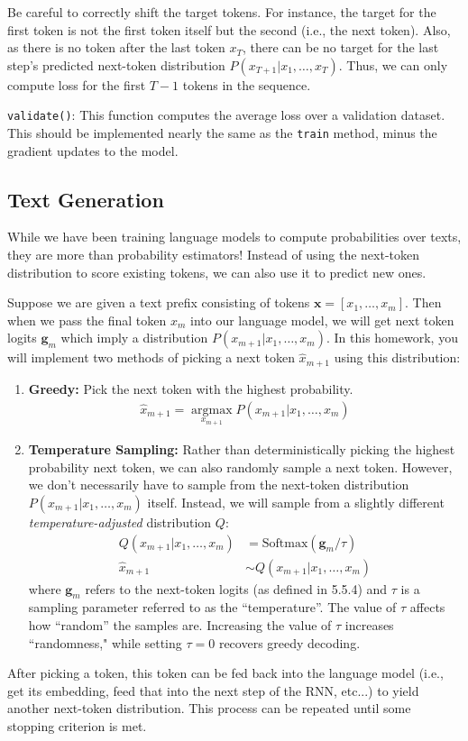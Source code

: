 \documentclass[11pt,addpoints,answers]{exam}
\newcommand{\gv}{\mathbf{g}}
\newcommand{\xv}{\mathbf{x}}
\newcommand \argmax {\operatorname*{argmax}}
\begin{document}
Be careful to correctly shift the target tokens. For instance, the target for the first token is not the first token itself but the second (i.e., the next token). Also, as there is no token after the last token $x_T$, there can be no target for the last step's predicted next-token distribution $P(x_{T+1} | x_1, \ldots, x_T)$. Thus, we can only compute loss for the first $T-1$ tokens in the sequence.

\texttt{validate()}: This function computes the average loss over a validation dataset. This should be implemented nearly the same as the \texttt{train} method, minus the gradient updates to the model.

\subsection{Text Generation}
While we have been training language models to compute probabilities over texts, they are more than probability estimators! Instead of using the next-token distribution to score existing tokens, we can also use it to predict new ones.

Suppose we are given a text prefix consisting of tokens $\xv = [x_1, \ldots, x_m]$. Then when we pass the final token $x_m$ into our language model, we will get next token logits $\gv_m$ which imply a distribution $P(x_{m+1} | x_1, \ldots, x_m)$. In this homework, you will implement two methods of picking a next token $\hat{x}_{m+1}$ using this distribution:

\begin{enumerate}
    \item \textbf{Greedy:} Pick the next token with the highest probability.
    \begin{align*}
        \hat{x}_{m+1} = \argmax_{x_{m+1}} P(x_{m+1} | x_1, \ldots, x_m)
    \end{align*}
    \item \textbf{Temperature Sampling:} Rather than deterministically picking the highest probability next token, we can also randomly sample a next token. However, we don't necessarily have to sample from the next-token distribution $P(x_{m+1} | x_1, \ldots, x_m)$ itself. Instead, we will sample from a slightly different \emph{temperature-adjusted} distribution $Q$:
    \begin{align*}
        Q(x_{m+1} | x_1, \ldots, x_m) &= \text{Softmax}(\gv_m / \tau) \\
        \hat{x}_{m+1} &\sim Q(x_{m+1} | x_1, \ldots, x_m)
    \end{align*}
    where $\gv_m$ refers to the next-token logits (as defined in 5.5.4) and $\tau$ is a sampling parameter referred to as the ``temperature''. The value of $\tau$ affects how ``random'' the samples are. Increasing the value of $\tau$ increases ``randomness," while setting $\tau = 0$ recovers greedy decoding.
\end{enumerate}
After picking a token, this token can be fed back into the language model (i.e., get its embedding, feed that into the next step of the RNN, etc...) to yield another next-token distribution. This process can be repeated until some stopping criterion is met.
\end{document}
